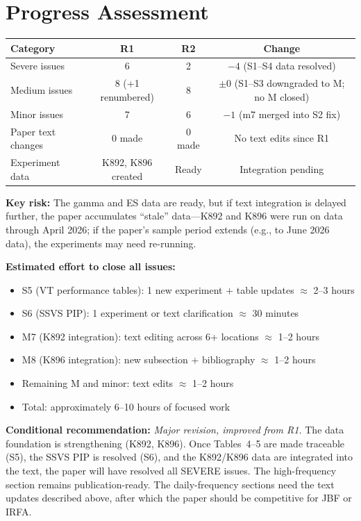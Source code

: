 \documentclass[12pt,a4paper]{article}
\begin{document}
\section*{Progress Assessment}

\begin{center}
\begin{tabular}{lccc}
\toprule
Category & R1 & R2 & Change \\
\midrule
Severe issues & 6 & 2 & $-4$ (S1--S4 data resolved) \\
Medium issues & 8 (+1 renumbered) & 8 & $\pm 0$ (S1--S3 downgraded to M; no M closed) \\
Minor issues & 7 & 6 & $-1$ (m7 merged into S2 fix) \\
Paper text changes & 0 made & 0 made & No text edits since R1 \\
Experiment data & K892, K896 created & Ready & Integration pending \\
\bottomrule
\end{tabular}
\end{center}

\noindent\textbf{Key risk:} The gamma and ES data are ready, but if text integration is delayed further, the paper accumulates ``stale'' data---K892 and K896 were run on data through April 2026; if the paper's sample period extends (e.g., to June 2026 data), the experiments may need re-running.

\bigskip

\noindent\textbf{Estimated effort to close all issues:}
\begin{itemize}[nosep]
\item S5 (VT performance tables): 1 new experiment $+$ table updates $\approx$ 2--3 hours
\item S6 (SSVS PIP): 1 experiment or text clarification $\approx$ 30 minutes
\item M7 (K892 integration): text editing across 6+ locations $\approx$ 1--2 hours
\item M8 (K896 integration): new subsection $+$ bibliography $\approx$ 1--2 hours
\item Remaining M and minor: text edits $\approx$ 1--2 hours
\item Total: approximately 6--10 hours of focused work
\end{itemize}

\bigskip

\noindent\textbf{Conditional recommendation:} \textit{Major revision, improved from R1.} The data foundation is strengthening (K892, K896). Once Tables~4--5 are made traceable (S5), the SSVS PIP is resolved (S6), and the K892/K896 data are integrated into the text, the paper will have resolved all SEVERE issues. The high-frequency section remains publication-ready. The daily-frequency sections need the text updates described above, after which the paper should be competitive for JBF or IRFA.
\end{document}
